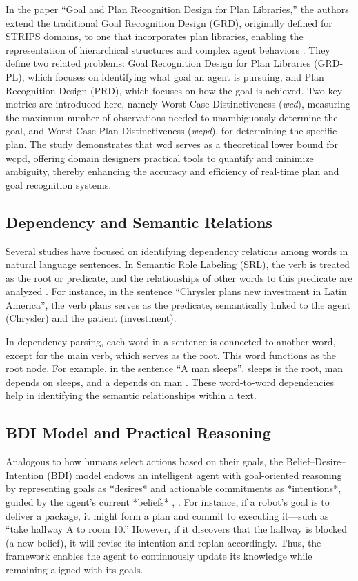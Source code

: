 \documentclass[a4paper,11pt]{lmcs}
\begin{document}
In the paper “Goal and Plan Recognition Design for Plan Libraries,” the authors extend the traditional Goal Recognition Design (GRD), originally defined for STRIPS domains, to one that incorporates plan libraries, enabling the representation of hierarchical structures and complex agent behaviors \citep{plan_library}. They define two related problems: Goal Recognition Design for Plan Libraries (GRD-PL), which focuses on identifying what goal an agent is pursuing, and Plan Recognition Design (PRD), which focuses on how the goal is achieved. Two key metrics are introduced here, namely Worst-Case Distinctiveness (\textit{wcd}), measuring the maximum number of observations needed to unambiguously determine the goal, and Worst-Case Plan Distinctiveness (\textit{wcpd}), for determining the specific plan. The study demonstrates that wcd serves as a theoretical lower bound for wcpd, offering domain designers practical tools to quantify and minimize ambiguity, thereby enhancing the accuracy and efficiency of real-time plan and goal recognition systems.

\subsection*{Dependency and Semantic Relations}
Several studies have focused on identifying dependency relations among words in natural language sentences. In Semantic Role Labeling (SRL), the verb is treated as the root or predicate, and the relationships of other words to this predicate are analyzed \citep{srl}. For instance, in the sentence “Chrysler plans new investment in Latin America”, the verb plans serves as the predicate, semantically linked to the agent (Chrysler) and the patient (investment).

In dependency parsing, each word in a sentence is connected to another word, except for the main verb, which serves as the root. This word functions as the root node. For example, in the sentence “A man sleeps”, sleeps is the root, man depends on sleeps, and a depends on man \citep{srl_survey}.  These word-to-word dependencies help in identifying the semantic relationships within a text.
\subsection*{BDI Model and Practical Reasoning}
Analogous to how humans select actions based on their goals, the Belief–Desire–Intention (BDI) model endows an intelligent agent with goal-oriented reasoning by representing goals as *desires* and actionable commitments as *intentions*, guided by the agent’s current *beliefs* \citep{bdi}, \citep{bdi_reasoning}. For instance, if a robot’s goal is to deliver a package, it might form a plan and commit to executing it—such as “take hallway A to room 10.” However, if it discovers that the hallway is blocked (a new belief), it will revise its intention and replan accordingly. Thus, the framework enables the agent to continuously update its knowledge while remaining aligned with its goals.
\end{document}
